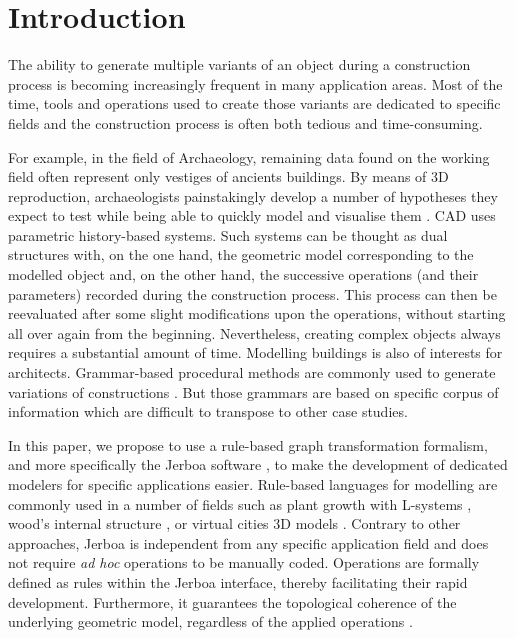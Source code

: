 \section{Introduction}  

The ability to generate multiple variants of an object during a construction process is  becoming increasingly frequent in many application areas. Most of the time, tools and operations used to create those variants are dedicated to specific fields and the construction process is often both tedious and time-consuming.

For example, in the field of Archaeology, remaining data found on the working field often represent only vestiges of ancients buildings. By means of 3D
reproduction, archaeologists painstakingly develop a number of hypotheses
they expect to test while being able to quickly model and
visualise them \cite{Quattrini_Baleani_2015}. CAD uses parametric history-based systems. Such systems can be thought as dual structures with,  on the one hand, the geometric model corresponding to the modelled
object and,  on the other hand, the successive operations (and their parameters) recorded during the construction process. This process can then be reevaluated after some slight modifications upon the operations, without starting all over again from the beginning. Nevertheless, creating complex objects always requires a substantial amount of time.
Modelling buildings is also of interests for architects. Grammar-based procedural methods are commonly used
to generate variations of constructions \cite{haegler2009procedural, muller2006procedural}. But those grammars are based on specific corpus of information which are difficult to transpose to other case studies.

In this paper, we propose to use  a rule-based graph transformation formalism, and more specifically the Jerboa software \cite{belhaouari2014jerboa}, to make the development of dedicated modelers for
specific applications easier. Rule-based languages for modelling
are commonly used in a number of fields such as plant growth with L-systems \cite{lindenmayer1974adding}, wood’s internal structure \cite{terraz20093gmap}, or virtual cities 3D models
\cite{esri2023cityengine, beirao2010implementing}. Contrary to other approaches, Jerboa is independent from any specific
application field and does not require \textit{ad hoc} operations to
be manually coded. Operations are formally defined as rules within the Jerboa interface, thereby facilitating their rapid development. Furthermore, it guarantees the topological coherence of the underlying geometric model,
 regardless of the applied operations .

